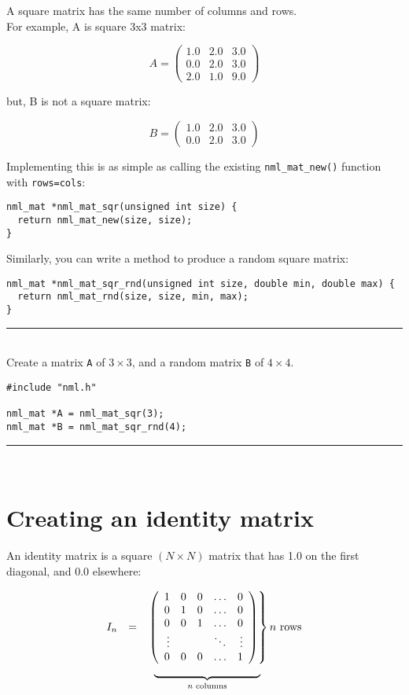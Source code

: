 A square matrix has the same number of columns and rows.
\\

For example, A is square 3x3 matrix:

$$
A = \left( \begin{array}{rrr}
1.0 & 2.0 & 3.0 \\
0.0 & 2.0 & 3.0 \\
2.0 & 1.0 & 9.0
\end{array} \right)
$$

but, B is not a square matrix:

$$
B
= \left( \begin{array}{rrr}
1.0 & 2.0 & 3.0 \\
0.0 & 2.0 & 3.0
\end{array} \right)
$$

Implementing this is as simple as calling the existing {\tt nml\_mat\_new()} function with {\tt rows=cols}:

\begin{verbatim}
nml_mat *nml_mat_sqr(unsigned int size) {
  return nml_mat_new(size, size);
}
\end{verbatim}

Similarly, you can write a method to produce a random square matrix:
\begin{verbatim}
nml_mat *nml_mat_sqr_rnd(unsigned int size, double min, double max) {
  return nml_mat_rnd(size, size, min, max);
} 
\end{verbatim}

\rule{\textwidth}{0.5pt}\\
\example \textsf{Create a matrix {\tt A} of $3\times 3$, and a random matrix {\tt B} of $4\times 4$}.

\begin{verbatim}
#include "nml.h"

nml_mat *A = nml_mat_sqr(3);
nml_mat *B = nml_mat_sqr_rnd(4);
\end{verbatim}
\rule{\textwidth}{0.5pt}\\

\section{Creating an identity matrix}

An identity matrix is a square $(N\times N)$ matrix that has 1.0 on the first diagonal, and 0.0 elsewhere:

$$
\begin{array}{rcl}
I_n & = &
\left. \left( \begin{array}{rrrcr}
1 & 0 & 0 & \ldots & 0 \\
0 & 1 & 0 & \ldots & 0 \\
0 & 0 & 1 & \ldots & 0 \\
\vdots & & & \ddots & \vdots \\
0 & 0 & 0 & \ldots & 1
\end{array} \right) \right\} {n \textrm{ rows}}
\\
& & \hspace{2mm}\underbrace{\hspace*{34mm}}_{\normalsize n \text{ columns}}
\end{array}
$$

